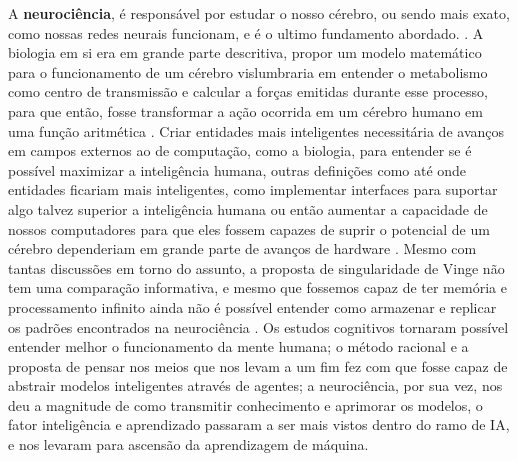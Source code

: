 A \textbf{neurociência}, é responsável por estudar o nosso cérebro, ou sendo mais exato, como nossas redes neurais funcionam, e é o ultimo fundamento abordado. \cite[10]{russell2003artificial}. A biologia em si era em grande parte descritiva, propor um modelo matemático para o funcionamento de um cérebro vislumbraria em entender o metabolismo como centro de transmissão e calcular a forças emitidas durante esse processo, para que então, fosse transformar a ação ocorrida em um cérebro humano em uma função aritmética \cite[1-3]{rashevsky1960mathematical}. Criar entidades mais inteligentes necessitária de avanços em campos externos ao de computação, como a biologia, para entender se é possível maximizar a inteligência humana, outras definições como até onde entidades ficariam mais inteligentes, como implementar interfaces para suportar algo talvez superior a inteligência humana ou então aumentar a capacidade de nossos computadores para que eles fossem capazes de suprir o potencial de um cérebro dependeriam em grande parte de avanços de hardware \cite[1-2]{vinge1993coming}. Mesmo com tantas discussões em torno do assunto, a proposta de singularidade de Vinge não tem uma comparação informativa, e mesmo que fossemos capaz de ter memória e processamento infinito ainda não é possível entender como armazenar e replicar os padrões encontrados na neurociência \cite[11-12]{russell2003artificial}. Os estudos cognitivos tornaram possível entender melhor o funcionamento da mente humana; o método racional e a proposta de pensar nos meios que nos levam a um fim fez com que fosse capaz de abstrair modelos inteligentes através de agentes; a neurociência, por sua vez, nos deu a magnitude de como transmitir conhecimento e aprimorar os modelos, o fator inteligência e aprendizado passaram a ser mais vistos dentro do ramo de IA, e nos levaram para ascensão da aprendizagem de máquina.

